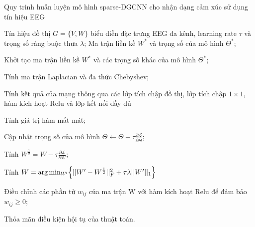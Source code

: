 \documentclass{article}
\makeatletter
\newcommand{\StatePar}[1]{%
  \State\parbox[t]{\dimexpr\linewidth-\ALG@thistlm}{\strut #1\strut}%
}
\let\oldState\State
\renewcommand{\State}{\oldState\strut}
\makeatother
\begin{document}
\begin{algorithm}

\caption{Quy trình huấn luyện mô hình sparse-DGCNN cho nhận dạng cảm xúc sử dụng tín hiệu EEG}\label{alg:cap}
\begin{algorithmic}[1]
\Require Tín hiệu đồ thị $G=\{V,W\}$ biểu diễn đặc trưng EEG đa kênh, learning rate $\tau$ và trọng số ràng buộc thưa $\lambda$;
\Ensure  Ma trận liền kề $W^{*}$ và trọng số của mô hình $\Theta^{*}$;
\State Khởi tạo ma trận liền kề $W^{*}$ và các trọng số khác của mô hình $\Theta^{*}$;


\Repeat

\StatePar{Tính ma trận Laplacian và đa thức Chebyshev;}
\StatePar{Tính kết quả của mạng thông qua các lớp tích chập đồ thị, lớp tích chập $1\times1$, hàm kích hoạt Relu và lớp kết nối đầy đủ}
\StatePar{Tính giá trị hàm mất mát;}
\StatePar{Cập nhật trọng số của mô hình $\Theta\leftarrow\Theta-\tau{\frac{\partial{\mathcal{L}}}{\partial\Theta}}$;}
\StatePar{Tính $W^{\frac{1}{2}}=W-\tau\frac{\partial{\mathcal{L}}}{\partial{W}}$;}
\StatePar{Tính $W=\arg\mathrm{min}_{W}\!_{^{\prime}}\Bigl\{||W^{\prime}-W^{\frac{1}{2}}||_{F}^{2}+\tau\lambda||W^{\prime}||_{1}\Bigr\}$}

\StatePar{Điều chỉnh các phần tử $w_{ij}$ của ma trận W với hàm kích hoạt Relu để đảm bảo $w_{ij}\geq 0$;}
\Until Thỏa mãn điều kiện hội tụ của thuật toán.

\end{algorithmic}
\end{algorithm}
\end{document}
